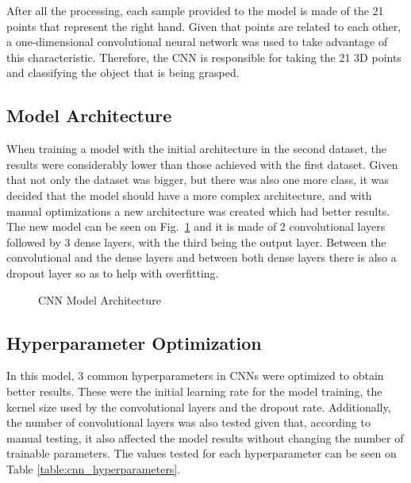After all the processing, each sample provided to the model is made of the 21 points that represent the right hand. Given that points are related to each other, a one-dimensional convolutional neural network was used to take advantage of this characteristic. Therefore, the CNN is responsible for taking the 21 3D points and classifying the object that is being grasped.

\subsection{Model Architecture}

When training a model with the initial architecture in the second dataset, the results were considerably lower than those achieved with the first dataset. Given that not only the dataset was bigger, but there was also one more class, it was decided that the model should have a more complex architecture, and with manual optimizations a new architecture was created which had better results. The new model can be seen on Fig.~\ref{fig:cnn_architecture} and it is made of 2 convolutional layers followed by 3 dense layers, with the third being the output layer. Between the convolutional and the dense layers and between both dense layers there is also a dropout layer so as to help with overfitting.

\begin{figure}[H]
    \centering
    {\fontsize{10}{12}\selectfont}
    \caption[CNN Model Architecture]{CNN Model Architecture}
    \label{fig:cnn_architecture}
\end{figure}

\subsection{Hyperparameter Optimization}

In this model, 3 common hyperparameters in CNNs were optimized to obtain better results. These were the initial learning rate for the model training, the kernel size used by the convolutional layers and the dropout rate. Additionally, the number of convolutional layers was also tested given that, according to manual testing, it also affected the model results without changing the number of trainable parameters. The values tested for each hyperparameter can be seen on Table \ref{table:cnn_hyperparameters}.

